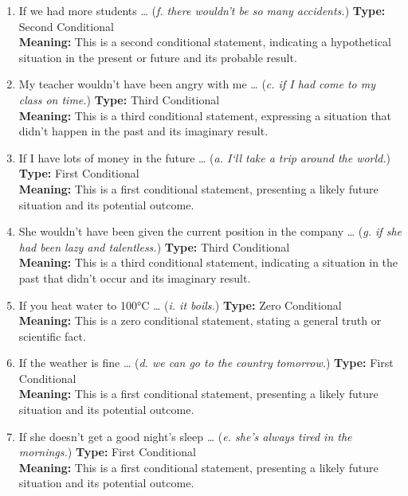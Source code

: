\begin{enumerate}
      \item If we had more students … (\textit{f. there wouldn’t be so many accidents.})
            \textbf{Type:} Second Conditional \\
            \textbf{Meaning:} This is a second conditional statement, indicating a hypothetical situation in the present or future and its probable result.

      \item My teacher wouldn’t have been angry with me … (\textit{c. if I had come to my class on time.})
            \textbf{Type:} Third Conditional \\
            \textbf{Meaning:} This is a third conditional statement, expressing a situation that didn't happen in the past and its imaginary result.

      \item If I have lots of money in the future … (\textit{a. I`ll take a trip around the world.})
            \textbf{Type:} First Conditional \\
            \textbf{Meaning:} This is a first conditional statement, presenting a likely future situation and its potential outcome.

      \item She wouldn't have been given the current position in the company … (\textit{g. if she had been lazy and talentless.})
            \textbf{Type:} Third Conditional \\
            \textbf{Meaning:} This is a third conditional statement, indicating a situation in the past that didn't occur and its imaginary result.

      \item If you heat water to 100°C … (\textit{i. it boils.})
            \textbf{Type:} Zero Conditional \\
            \textbf{Meaning:} This is a zero conditional statement, stating a general truth or scientific fact.

      \item If the weather is fine … (\textit{d. we can go to the country tomorrow.})
            \textbf{Type:} First Conditional \\
            \textbf{Meaning:} This is a first conditional statement, presenting a likely future situation and its potential outcome.

      \item If she doesn’t get a good night’s sleep … (\textit{e. she’s always tired in the mornings.})
            \textbf{Type:} First Conditional \\
            \textbf{Meaning:} This is a first conditional statement, presenting a likely future situation and its potential outcome.


\end{enumerate}
